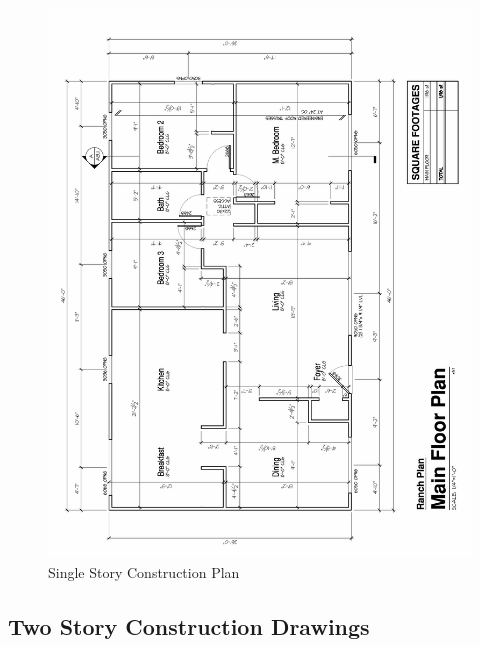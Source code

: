 \documentclass{article}
\begin{document}
\begin{appendices}
\begin{figure}[H]
	\centering
	\includegraphics[width = 6.25in]{0_Images/Construction_Drawings/Ranch_Floor_Plan.pdf}
	\caption{Single Story Construction Plan}
\end{figure}

\clearpage

\subsection{Two Story Construction Drawings}


\end{appendices}
\end{document}
